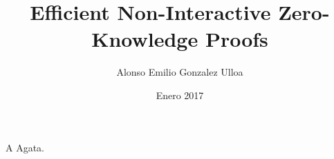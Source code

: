 \documentclass[upright, contnum]{umemoria}
\author{Alonso Emilio Gonzalez Ulloa}
\title{Efficient Non-Interactive Zero-Knowledge Proofs}
\date{Enero 2017}
\begin{document}
\frontmatter
\maketitle




\begin{dedicatoria} %
A Agata.
\end{dedicatoria}

\begin{thanks} %
\lipsum[1-2]
\end{thanks}
\cleardoublepage

\tableofcontents

\mainmatter


%
%
%
%





\end{document}
